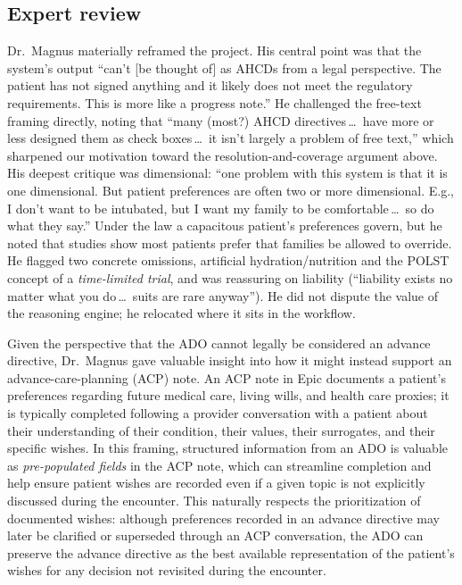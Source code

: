 \documentclass[10pt]{article}
\begin{document}
\subsection{Expert review}
Dr.\ Magnus materially reframed the project. His central point was that the system's output ``can't [be thought of] as AHCDs from a legal perspective. The patient has not signed anything and it likely does not meet the regulatory requirements. This is more like a progress note.'' He challenged the free-text framing directly, noting that ``many (most?) AHCD directives\,\dots\ have more or less designed them as check boxes\,\dots\ it isn't largely a problem of free text,'' which sharpened our motivation toward the resolution-and-coverage argument above. His deepest critique was dimensional: ``one problem with this system is that it is one dimensional. But patient preferences are often two or more dimensional. E.g., I don't want to be intubated, but I want my family to be comfortable\,\dots\ so do what they say.'' Under the law a capacitous patient's preferences govern, but he noted that studies show most patients prefer that families be allowed to override. He flagged two concrete omissions, artificial hydration/nutrition and the POLST concept of a \emph{time-limited trial}, and was reassuring on liability (``liability exists no matter what you do\,\dots\ suits are rare anyway''). He did not dispute the value of the reasoning engine; he relocated where it sits in the workflow.

Given the perspective that the ADO cannot legally be considered an advance directive, Dr.\ Magnus gave valuable insight into how it might instead support an advance-care-planning (ACP) note. An ACP note in Epic documents a patient's preferences regarding future medical care, living wills, and health care proxies; it is typically completed following a provider conversation with a patient about their understanding of their condition, their values, their surrogates, and their specific wishes. In this framing, structured information from an ADO is valuable as \emph{pre-populated fields} in the ACP note, which can streamline completion and help ensure patient wishes are recorded even if a given topic is not explicitly discussed during the encounter. This naturally respects the prioritization of documented wishes: although preferences recorded in an advance directive may later be clarified or superseded through an ACP conversation, the ADO can preserve the advance directive as the best available representation of the patient's wishes for any decision not revisited during the encounter.
\end{document}
